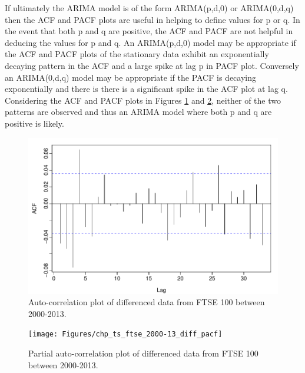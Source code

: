 If ultimately the ARIMA model is of the form ARIMA(p,d,0) or ARIMA(0,d,q) then the ACF and PACF plots are useful in helping to define values for p or q. In the event that both p and q are positive, the ACF and PACF are not helpful in deducing the values for p and q. An ARIMA(p,d,0) model may be appropriate if the ACF and PACF plots of the stationary data exhibit an exponentially decaying pattern in the ACF and a large spike at lag p in PACF plot. Conversely an ARIMA(0,d,q) model may be appropriate if the PACF is decaying exponentially and there is there is a significant spike in the ACF plot at lag q. Considering the ACF and PACF plots in Figures \ref{fig:chp_ts_ftse_2000-13_diff_acf} and \ref{fig:chp_ts_ftse_2000-13_diff_pacf}, neither of the two patterns are observed and thus an ARIMA model where both p and q are positive is likely.

\begin{figure}[tbh]
\centering
\includegraphics{Figures/chp_ts_ftse_2000-13_diff_acf}
\caption[ACF of FTSE 100 between 2000-2013]{Auto-correlation plot of differenced data from FTSE 100 between 2000-2013.}
\label{fig:chp_ts_ftse_2000-13_diff_acf}
\end{figure}

\begin{figure}[tbh]
\centering
\texttt{[image: Figures/chp\_ts\_ftse\_2000-13\_diff\_pacf]}
\caption[PACF of FTSE 100 between 2000-2013]{Partial auto-correlation plot of differenced data from FTSE 100 between 2000-2013.}
\label{fig:chp_ts_ftse_2000-13_diff_pacf}
\end{figure}

\textquotesingle\newpage
